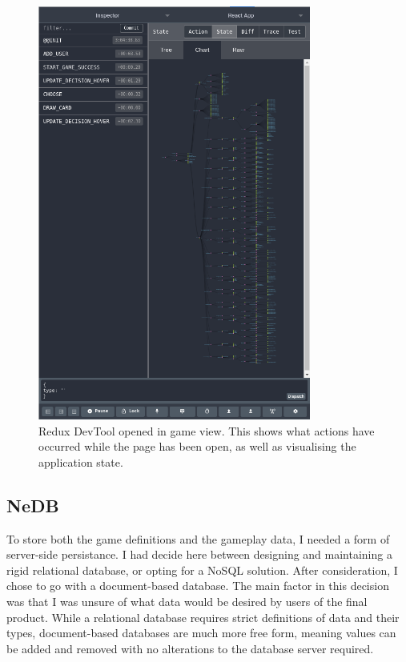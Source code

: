 \begin{figure}[!h]
	\centering
	\includegraphics[width=0.8\textwidth]{./images/impl/redux_view.png}
	\caption{Redux DevTool \cite{ReduxDev} opened in game view. This shows what actions have occurred while the page has been open, as well as visualising the application state.}
	\label{fig:redux_view}
\end{figure}

\subsection{NeDB}
To store both the game definitions and the gameplay data, I needed a form of server-side persistance. I had  decide here between designing and maintaining a rigid relational database, or opting for a NoSQL \cite{NoSQL} solution. After consideration, I chose to go with a document-based database. The main factor in this decision was that I was unsure of what data would be desired by users of the final product. While a relational database requires strict definitions of data and their types, document-based databases are much more free form, meaning values can be added and removed with no alterations to the database server required.


